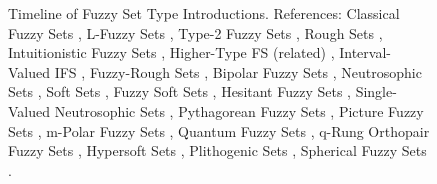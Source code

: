 \begin{landscape}
\begin{figure}[h!]
\begin{tikzpicture}
    \end{tikzpicture}
    \caption{Timeline of Fuzzy Set Type Introductions. References: Classical Fuzzy Sets \cite{Zadeh1965}, L-Fuzzy Sets \cite{Goguen1967}, Type-2 Fuzzy Sets \cite{Zadeh1975}, Rough Sets \cite{Pawlak1982_Rough}, Intuitionistic Fuzzy Sets \cite{Atanassov1986}, Higher-Type FS (related) \cite{Turksen1986_TypeNRelated}, Interval-Valued IFS \cite{AtanassovGargov1989}, Fuzzy-Rough Sets \cite{DuboisPrade1990_FuzzyRough}, Bipolar Fuzzy Sets \cite{Zhang1994_Bipolar}, Neutrosophic Sets \cite{Smarandache1998_Neutrosophic}, Soft Sets \cite{Molodtsov1999_Soft}, Fuzzy Soft Sets \cite{MajiBiswasRoy2001_FuzzySoft}, Hesitant Fuzzy Sets \cite{Torra2010}, Single-Valued Neutrosophic Sets \cite{Wang2010_SVNS}, Pythagorean Fuzzy Sets \cite{Yager2013_Pythagorean}, Picture Fuzzy Sets \cite{Cuong2013_Picture}, m-Polar Fuzzy Sets \cite{Chen2014_mPolar}, Quantum Fuzzy Sets \cite{Pykacz2015_Quantum}, q-Rung Orthopair Fuzzy Sets \cite{Yager2017_qRung}, Hypersoft Sets \cite{Smarandache2018_Hypersoft}, Plithogenic Sets \cite{Smarandache2018_Plithogenic}, Spherical Fuzzy Sets \cite{GundogduKahraman2019_Spherical}.}
    \label{fig:fuzzy_timeline}
\end{figure}

\end{landscape}